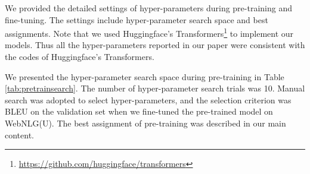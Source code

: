 \documentclass[11pt,a4paper]{article}
\begin{document}
We provided the detailed settings of hyper-parameters during pre-training and fine-tuning. The settings include hyper-parameter search space and best assignments. Note that we used Huggingface's Transformers\footnote{\url{https://github.com/huggingface/transformers}} to implement our models. Thus all the hyper-parameters reported in our paper were consistent with the codes of Huggingface's Transformers.

\begin{table} [!htp]
\centering
\scriptsize
{}
\caption{Best assignments of hyper-parameters on the downstream datasets.}
\label{tab:finetunebest}
\end{table}


We presented the hyper-parameter search space during pre-training in Table \ref{tab:pretrainsearch}. The number of hyper-parameter search trials was 10. Manual search was adopted to select hyper-parameters, and the selection criterion was BLEU on the validation set when we fine-tuned the pre-trained model on WebNLG(U). The best assignment of pre-training was described in our main content.
\end{document}
